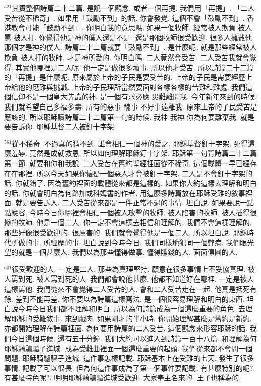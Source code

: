 \documentclass{book}
\begin{document}
$^{521}$其實整個詩篇二十二篇.
是說一個觀念.
或者一個再提.
我們用「再提」.
「二人受苦從不稀奇」.
如果用「鼓勵不到」的話.
你會發覺.
這個不會「鼓勵不到」.
香港教會可能「鼓勵不到」.
你明白我的意思嗎.
如果一個牧師.
經常被人欺負 被人罵 被人打.
你覺得他是神的僕人還是不是.
還是那個牧師很受歡迎.
很多人擁戴他.
那個才是神的僕人.
詩篇二十二篇就要「鼓勵不到」.
是什麼呢.
就是那些經常被人欺負 被人打的牧師.
才是神所愛的.
你明白嗎.
二人竟然會受苦.
二人受苦我就會覺得.
其實他哪裡是二人呢.
他一定是做很多壞事.
所以他才受苦.
所以詩篇二十二篇的「再提」是什麼呢.
原來屬於上帝的子民是要受苦的.
上帝的子民是需要經歷上帝給他的磨難與挑戰.
上帝的子民理所當然要面對各樣各樣的苦難和難處.
我們這個信仰不是一個皇大先識的神.
是一個有求必應 災難離開我.
今年新年來到的時候.
我們就希望自己多福多壽.
所有的惡事 醜事 不好事遠離我.
原來上帝的子民受苦是應該的.
所以耶穌讀詩篇二十二篇第一句的時候.
我神 我神 你為何要離棄我.
就是要告訴你.
耶穌基督二人被釘十字架.

$^{561}$從不稀奇.
不過真的猜不到.
誰會相信一個神的愛之.
耶穌基督釘十字架.
死得這麼羞辱.
竟然是成就救恩.
所以如何理解耶穌釘十字架.
耶穌第一句背詩篇二十二篇第一節.
就要和你和我說.
二人受苦在舊約聖經裡面從不稀奇.
這個載體一早已經存在在那裡.
所以今天如果你懷疑一個惡人才會被釘十字架.
二人是不會釘十字架的話.
你就錯了.
因為舊約裡面的載體從來都是這樣的.
如果你大約這樣去理解和明白的話.
你就會明白為何路加或科姆書的作者.
用這麼多詩篇放在耶穌受難的敘事裡面.
就是要告訴人.
二人受苦從來都是一件正常不過的事情.
坦白說.
如果要說一點點應容.
今時今日你哪裡會相信一個被人攻擊的牧師.
被人陷害的牧師.
被人插得很慘的牧師.
他是一個二人.
你一定不會這樣去相信和理解的.
我們不會這樣理解的.
那些好像很受歡迎的.
很厲害的.
我們就會覺得他是一個二人.
所以坦白說.
耶穌時代所做的事.
所經歷的事.
坦白說到今時今日.
我們同樣地犯同一個弊病.
我們眼光望的就是一個甚麼人.
我們以為那些懂得做事.
懂得賺錢的人.
面面俱圓的人.

$^{601}$很受歡迎的人.
一定是二人.
那些為真理堅持.
願意在很多事情上不妥協真理.
被人罵到死.
被人罵到死的人.
我們都會說他甚麼.
他都不知道好在哪裡.
一定是被人這樣罵他.
我們從來不會覺得二人受苦的人.
會和二人受苦走在一起.
他真是抵死有餘.
差到不能再差.
你不要以為詩篇這樣寫法.
是一個很容易理解和明白的東西.
坦白說今時今日我們都不理解和明白.
所以為何詩篇成為一個這麼重要的角色.
去理解耶穌的受難敘事.
來到戲肉.
如果剛才的半小時.
你開始理解甚麼是舊約是新約.
亦都開始理解在詩篇裡面.
為何要用詩篇的二人受苦.
這個觀念來形容耶穌的話.
我們今日這個時候.
還有五十分鐘.
我們大約可以進入到詩篇一百十八篇.
和理解為何耶穌騎驢驅子進城.
成為受難曲裡面一個這麼重要的起頭.
我們從來都不會問一個問題.
耶穌騎驢驅子進城.
這件事怎樣記載.
耶穌基本上在受難的七天.
發生了很多事情.
記載了可以很長.
但為何這件事成為了第一個事件要記載.
有甚麼特別的呢?有甚麼特色呢?.
明明耶穌騎驢驅進城受歡迎.
大家奉主名來的.
王子也稱為的.
\end{document}
